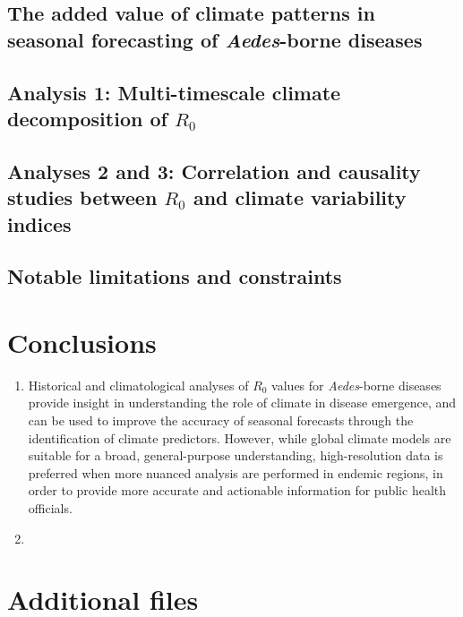 \documentclass[10pt,twocolumn]{wlscirep}
\begin{document}
\subsection{The added value of climate patterns in seasonal forecasting of \textit{Aedes}-borne diseases} \label{sec-discussion-added-value}

\subsection{Analysis 1: Multi-timescale climate decomposition of $R_0$} \label{sec-discussion-analysis-1}

\subsection{Analyses 2 and 3: Correlation and causality studies between $R_0$ and climate variability indices} \label{sec-discussion-analysis-2-3}

\subsection{Notable limitations and constraints} \label{sec-discussion-limitations}

\section{Conclusions} \label{sec-conclusions}

\begin{enumerate}
  \item Historical and climatological analyses of $R_0$ values for \textit{Aedes}-borne diseases provide insight in understanding the role of climate in disease emergence, and can be used to improve the accuracy of seasonal forecasts through the identification of climate predictors. However, while global climate models are suitable for a broad, general-purpose understanding, high-resolution data is preferred when more nuanced analysis are performed in endemic regions, in order to provide more accurate and actionable information for public health officials.
  \item
\end{enumerate}

\section{Additional files} \label{sec-additional-files}
\end{document}
